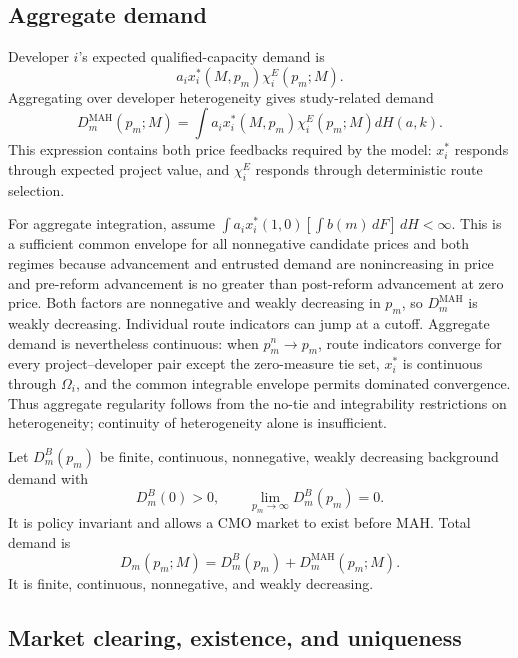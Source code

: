 \subsection{Aggregate demand}
\label{subsec:p06-demand}

Developer \(i\)'s expected qualified-capacity demand is
\[
  a_ix_i^*(M,p_m)\chi_i^E(p_m;M).
\]
Aggregating over developer heterogeneity gives study-related demand
\begin{equation}
  D_m^{\mathrm{MAH}}(p_m;M)
  =
  \int
  a_ix_i^*(M,p_m)\chi_i^E(p_m;M)
  dH(a,k).
  \label{eq:p06-study-demand}
\end{equation}
This expression contains both price feedbacks required by the model:
\(x_i^*\) responds through expected project value, and
\(\chi_i^E\) responds through deterministic route selection.

For aggregate integration, assume
\(\int a_i x_i^*(1,0)[\int b(m)\,dF]\,dH<\infty\).
This is a sufficient common envelope for all nonnegative candidate prices
and both regimes because advancement and entrusted demand are nonincreasing
in price and pre-reform advancement is no greater than post-reform
advancement at zero price. Both factors are nonnegative and weakly decreasing in \(p_m\), so
\(D_m^{\mathrm{MAH}}\) is weakly decreasing. Individual route indicators can
jump at a cutoff. Aggregate demand is nevertheless continuous: when
\(p_m^n\to p_m\), route indicators converge for every project--developer
pair except the zero-measure tie set, \(x_i^*\) is continuous through
\(\Omega_i\), and the common integrable envelope permits dominated
convergence. Thus aggregate regularity follows from the no-tie and integrability
restrictions on heterogeneity; continuity of heterogeneity alone is insufficient.

Let \(D_m^B(p_m)\) be finite, continuous, nonnegative, weakly decreasing
background demand with
\[
  D_m^B(0)>0,
  \qquad
  \lim_{p_m\to\infty}D_m^B(p_m)=0.
\]
It is policy invariant and allows a CMO market to exist before MAH. Total
demand is
\begin{equation}
  D_m(p_m;M)
  =
  D_m^B(p_m)
  +
  D_m^{\mathrm{MAH}}(p_m;M).
  \label{eq:p06-total-demand}
\end{equation}
It is finite, continuous, nonnegative, and weakly decreasing.

\subsection{Market clearing, existence, and uniqueness}
\label{subsec:p06-clearing}

